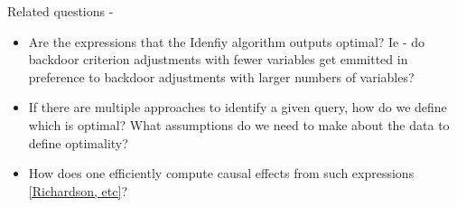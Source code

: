 \documentclass{article}
\theoremstyle{plain}
\theoremstyle{definition}
\begin{document}
Related questions - 
\begin{itemize}
\item Are the expressions that the Idenfiy algorithm outputs optimal? Ie - do backdoor criterion adjustments with fewer variables get emmitted in preference to backdoor adjustments with larger numbers of variables? 
\item If there are multiple approaches to identify a given query, how do we define which is optimal? What assumptions do we need to make about the data to define optimality? 
\item How does one efficiently compute causal effects from such expressions \ref{Richardson, etc}?
\end{itemize}

 
\end{document}
